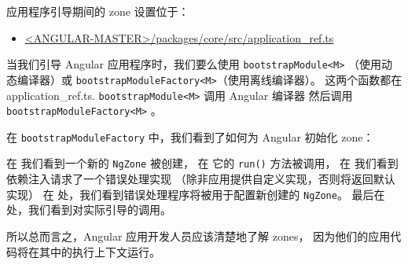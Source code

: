
应用程序引导期间的 zone 设置位于：

\begin{itemize}
  \item \href{https://github.com/angular/angular/blob/master/packages/core/src/application_ref.ts}
        {<ANGULAR-MASTER>/packages/core/src/application\_ref.ts}
\end{itemize}



当我们引导 Angular 应用程序时，我们要么使用 \texttt{bootstrapModule<M>}
（使用动态编译器）或 \texttt{bootstrapModuleFactory<M>}（使用离线编译器）。
这两个函数都在 application\_ref.ts. \texttt{bootstrapModule<M>}
调用 Angular 编译器  然后调用 \texttt{bootstrapModuleFactory<M>} 。




在 \texttt{bootstrapModuleFactory} 中，我们看到了如何为 Angular 初始化 zone：




在  我们看到一个新的 \texttt{NgZone} 被创建，
在  它的 \texttt{run()} 方法被调用，
在  我们看到依赖注入请求了一个错误处理实现
（除非应用提供自定义实现，否则将返回默认实现）
在  处，我们看到错误处理程序将被用于配置新创建的 \texttt{NgZone}。
最后在  处，我们看到对实际引导的调用。


所以总而言之，Angular 应用开发人员应该清楚地了解 zones，
因为他们的应用代码将在其中的执行上下文运行。
